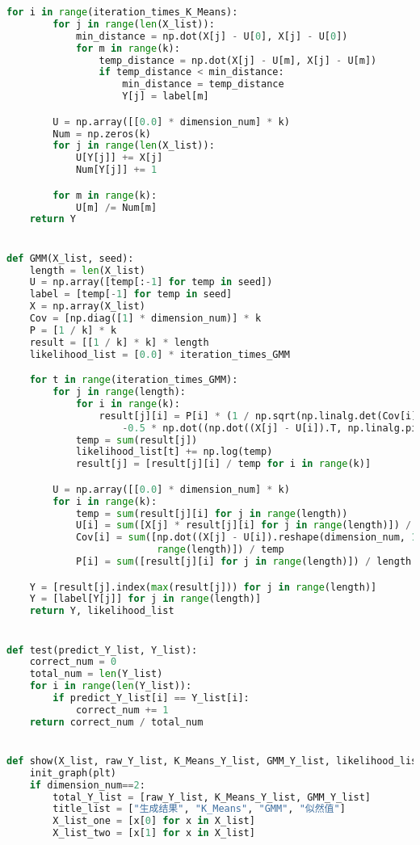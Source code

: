\documentclass[withoutpreface,bwprint]{cumcmthesis}
\begin{document}
\begin{appendix}
\begin{lstlisting}[language=python]
    for i in range(iteration_times_K_Means):
        for j in range(len(X_list)):
            min_distance = np.dot(X[j] - U[0], X[j] - U[0])
            for m in range(k):
                temp_distance = np.dot(X[j] - U[m], X[j] - U[m])
                if temp_distance < min_distance:
                    min_distance = temp_distance
                    Y[j] = label[m]

        U = np.array([[0.0] * dimension_num] * k)
        Num = np.zeros(k)
        for j in range(len(X_list)):
            U[Y[j]] += X[j]
            Num[Y[j]] += 1

        for m in range(k):
            U[m] /= Num[m]
    return Y


def GMM(X_list, seed):
    length = len(X_list)
    U = np.array([temp[:-1] for temp in seed])
    label = [temp[-1] for temp in seed]
    X = np.array(X_list)
    Cov = [np.diag([1] * dimension_num)] * k
    P = [1 / k] * k
    result = [[1 / k] * k] * length
    likelihood_list = [0.0] * iteration_times_GMM

    for t in range(iteration_times_GMM):
        for j in range(length):
            for i in range(k):
                result[j][i] = P[i] * (1 / np.sqrt(np.linalg.det(Cov[i]))) * np.exp(
                    -0.5 * np.dot((np.dot((X[j] - U[i]).T, np.linalg.pinv(Cov[i]))), X[j] - U[i]))
            temp = sum(result[j])
            likelihood_list[t] += np.log(temp)
            result[j] = [result[j][i] / temp for i in range(k)]

        U = np.array([[0.0] * dimension_num] * k)
        for i in range(k):
            temp = sum(result[j][i] for j in range(length))
            U[i] = sum([X[j] * result[j][i] for j in range(length)]) / temp
            Cov[i] = sum([np.dot((X[j] - U[i]).reshape(dimension_num, 1), (X[j] - U[i]).reshape(1, dimension_num)) * result[j][i] for j in
                          range(length)]) / temp
            P[i] = sum([result[j][i] for j in range(length)]) / length

    Y = [result[j].index(max(result[j])) for j in range(length)]
    Y = [label[Y[j]] for j in range(length)]
    return Y, likelihood_list


def test(predict_Y_list, Y_list):
    correct_num = 0
    total_num = len(Y_list)
    for i in range(len(Y_list)):
        if predict_Y_list[i] == Y_list[i]:
            correct_num += 1
    return correct_num / total_num


def show(X_list, raw_Y_list, K_Means_Y_list, GMM_Y_list, likelihood_list):
    init_graph(plt)
    if dimension_num==2:
        total_Y_list = [raw_Y_list, K_Means_Y_list, GMM_Y_list]
        title_list = ["生成结果", "K_Means", "GMM", "似然值"]
        X_list_one = [x[0] for x in X_list]
        X_list_two = [x[1] for x in X_list]


\end{lstlisting}
\end{appendix}
\end{document}
